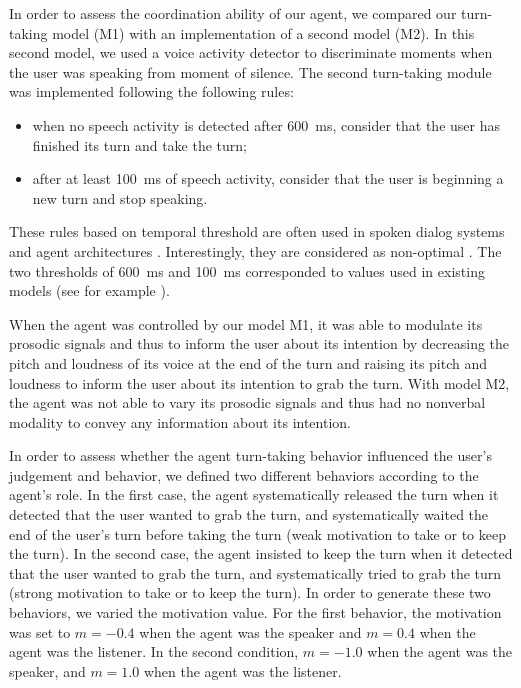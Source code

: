 In order to assess the coordination ability of our agent, we compared our turn-taking model (M1) with an implementation of a second model (M2). 
In this second model, we used a voice activity detector to discriminate moments when the user was speaking from moment of silence. 
The second turn-taking module was implemented following the following rules: 
\begin{itemize}
\item when no speech activity is detected after 600~ms, consider that the user has finished its turn and take the turn;
\item after at least 100~ms of speech activity, consider that the user is beginning a new turn and stop speaking. 
\end{itemize} 
These rules based on temporal threshold are often used in spoken dialog systems and agent architectures \citep{ward_root_2005}. Interestingly, they are considered as non-optimal \citep{ward_root_2005}. The two thresholds of 600~ms and 100~ms corresponded to values used in existing models (see for example \citep{ferrer_is_2002}). 

When the agent was controlled by our model M1, it was able to modulate its prosodic signals and thus to inform the user about its intention by decreasing the pitch and loudness of its voice at the end of the turn and raising its pitch and loudness to inform the user about its intention to grab the turn.  
With model M2, the agent was not able to vary its prosodic signals and thus had no nonverbal modality to convey any information about its intention. 

In order to assess whether the agent turn-taking behavior influenced the user's judgement and behavior, we defined two different behaviors according to the agent's role. In the first case, the agent systematically released the turn when it detected that the user wanted to grab the turn, and systematically waited the end of the user's turn before taking the turn (weak motivation to take or to keep the turn). In the second case, the agent insisted to keep the turn when it detected that the user wanted to grab the turn, and systematically tried to grab the turn (strong motivation to take or to keep the turn). In order to generate these two behaviors, we varied the motivation value. 
For the first behavior, the motivation was set to $m=-0.4$ when the agent was the speaker and $m=0.4$ when the agent was the listener. In the second condition, $m=-1.0$ when the agent was the speaker, and $m=1.0$ when the agent was the listener.

